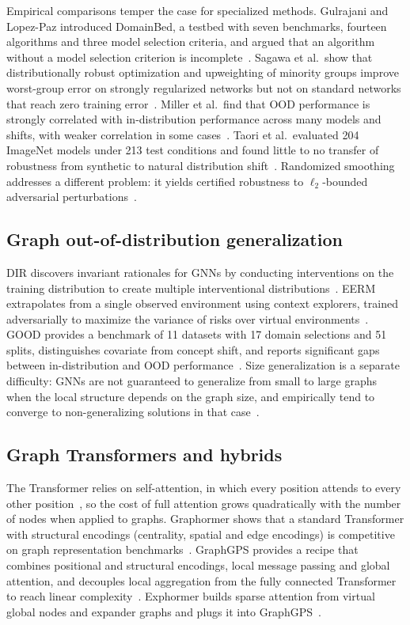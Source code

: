 \documentclass[a4paper,10pt]{article}
\begin{document}
Empirical comparisons temper the case for specialized methods. Gulrajani and Lopez-Paz introduced DomainBed, a testbed with seven benchmarks, fourteen algorithms and three model selection criteria, and argued that an algorithm without a model selection criterion is incomplete~\cite{gulrajani2021lost}. Sagawa et al.\ show that distributionally robust optimization and upweighting of minority groups improve worst-group error on strongly regularized networks but not on standard networks that reach zero training error~\cite{sagawa2020dro}. Miller et al.\ find that OOD performance is strongly correlated with in-distribution performance across many models and shifts, with weaker correlation in some cases~\cite{miller2021line}. Taori et al.\ evaluated 204 ImageNet models under 213 test conditions and found little to no transfer of robustness from synthetic to natural distribution shift~\cite{taori2020natural}. Randomized smoothing addresses a different problem: it yields certified robustness to $\ell_2$-bounded adversarial perturbations~\cite{cohen2019smoothing}.

\subsection{Graph out-of-distribution generalization}

DIR discovers invariant rationales for GNNs by conducting interventions on the training distribution to create multiple interventional distributions~\cite{wu2022dir}. EERM extrapolates from a single observed environment using context explorers, trained adversarially to maximize the variance of risks over virtual environments~\cite{wu2022eerm}. GOOD provides a benchmark of 11 datasets with 17 domain selections and 51 splits, distinguishes covariate from concept shift, and reports significant gaps between in-distribution and OOD performance~\cite{gui2022good}. Size generalization is a separate difficulty: GNNs are not guaranteed to generalize from small to large graphs when the local structure depends on the graph size, and empirically tend to converge to non-generalizing solutions in that case~\cite{yehudai2021size}.

\subsection{Graph Transformers and hybrids}

The Transformer relies on self-attention, in which every position attends to every other position~\cite{vaswani2017attention}, so the cost of full attention grows quadratically with the number of nodes when applied to graphs. Graphormer shows that a standard Transformer with structural encodings (centrality, spatial and edge encodings) is competitive on graph representation benchmarks~\cite{ying2021graphormer}. GraphGPS provides a recipe that combines positional and structural encodings, local message passing and global attention, and decouples local aggregation from the fully connected Transformer to reach linear complexity~\cite{rampasek2022graphgps}. Exphormer builds sparse attention from virtual global nodes and expander graphs and plugs it into GraphGPS~\cite{shirzad2023exphormer}.
\end{document}
